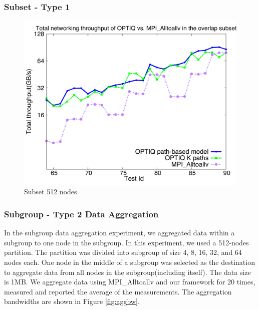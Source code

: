 \subsubsection{Subset - Type 1}

\begin{figure}[!htb]
\vspace{-0.1in}
\centering
\includegraphics[scale=0.30]{figures/subset_512.pdf}
\vspace{-0.1in}
\caption{Subset 512 nodes}
\vspace{-0.1in}
\label{fig:subset_512}
\end{figure}

\subsubsection{Subgroup - Type 2 Data Aggregation}

In the subgroup data aggregation experiment, we aggregated data within a subgroup to one node in the subgroup. In this experiment, we used a 512-nodes partition. The partition was divided into subgroup of size 4, 8, 16, 32, and 64 nodes each. One node in the middle of a subgroup was selected as the destination to aggregate data from all nodes in the subgroup(including itself). The data size is 1MB. We aggregate data using MPI\_Alltoallv and our framework for 20 times, measured and reported the average of the measurements. The aggregation bandwidths are shown in Figure \ref{fig:aggbw}.

